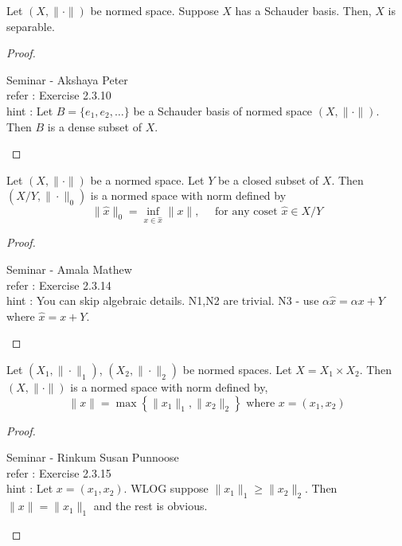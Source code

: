 \begin{lemma}[separable]
	Let $(X,\|\cdot\|)$ be normed space.
	Suppose $X$ has a Schauder basis.
	Then, $X$ is separable.
\end{lemma}
\begin{proof}
\begin{important}
	Seminar - Akshaya Peter\\
	refer : Exercise 2.3.10\\
	hint : Let $B = \{ e_1,e_2, \dots \}$ be a Schauder basis of normed space $(X,\|\cdot\|)$. Then $B$ is a dense subset of $X$.
\end{important}
\end{proof}

\begin{lemma}
	Let $(X,\| \cdot \|)$ be a normed space.
	Let $Y$ be a closed subset of $X$.
	Then $(X/Y,\|\cdot\|_0)$ is a normed space with norm defined by
	\[ \|\hat{x}\|_0 = \inf_{x \in \hat{x}} \| x \|, \quad \text{ for any coset } \hat{x} \in X/Y \]
\end{lemma}
\begin{proof}
\begin{important}
	Seminar - Amala Mathew\\
	refer : Exercise 2.3.14\\
	hint : You can skip algebraic details. N1,N2 are trivial. N3 - use $\alpha \hat{x} = \alpha x + Y$ where $\hat{x} = x+Y$.
\end{important}
\end{proof}
\begin{lemma}
	Let $(X_1,\|\cdot\|_1)$, $(X_2,\|\cdot\|_2)$ be normed spaces.
	Let $X = X_1 \times X_2$.
	Then $(X,\|\cdot\|)$ is a normed space with norm defined by,
	\[ \| x \| = \max \left\{ \|x_1\|_1,\|x_2\|_2 \right\} \text{ where } x = (x_1,x_2) \]
\end{lemma}
\begin{proof}
\begin{important}
	Seminar - Rinkum Susan Punnoose\\
	refer : Exercise 2.3.15\\
	hint : Let $x = (x_1,x_2)$. WLOG suppose $\|x_1\|_1 \ge \|x_2\|_2$. Then $\| x \| = \| x_1 \|_1$ and the rest is obvious.
\end{important}
\end{proof}

